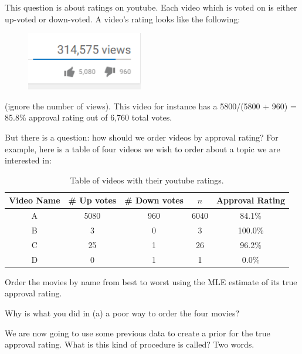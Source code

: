 \documentclass[12pt]{article}
\begin{document}
\pagebreak

\problem This question is about ratings on youtube. Each video which is voted on is either up-voted or down-voted. A video's rating looks like the following:

\begin{figure}[htp]
\centering
\includegraphics[width=2in]{updown.png}
\end{figure}

\noindent (ignore the number of views). This video for instance has a 5800/(5800 + 960) = 85.8\% approval rating out of 6,760 total votes.  

But there is a question: how should we order videos by approval rating? For example, here is a table of four videos we wish to order about a topic we are interested in:

\begin{table}[htp]
\centering
\begin{tabular}{ccccc}
Video Name & \# Up votes & \# Down votes & $n$ & Approval Rating \\ \hline
A & 5080 & 960 & 6040 & 84.1\% \\
B & 3 & 0 & 3 & 100.0\% \\
C & 25 & 1 & 26 & 96.2\% \\
D & 0 & 1 & 1 & 0.0\%
\end{tabular}
\caption{Table of videos with their youtube ratings.}
\label{tab:ratings}
\end{table}




\benum

 Order the movies by name from best to worst using the MLE estimate of its true approval rating. %

 Why is what you did in (a) a poor way to order the four movies? %

 We are now going to use some previous data to create a prior for the true approval rating. What is this kind of procedure is called? Two words. %
\end{document}
